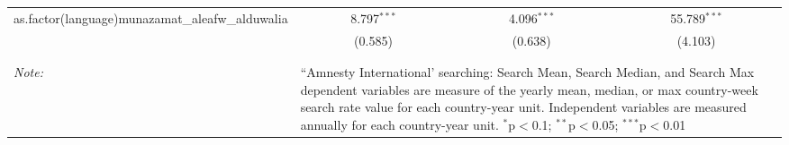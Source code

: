 \begin{table}[!htbp]
\begin{tabular}{@{\extracolsep{5pt}}lccc}
  as.factor(language)munazamat\_aleafw\_alduwalia & 8.797$^{***}$ & 4.096$^{***}$ & 55.789$^{***}$ \\ 
  & (0.585) & (0.638) & (4.103) \\ 
 \hline \\[-1.8ex] 
\hline 
\hline \\[-1.8ex] 
\textit{Note:}  & \multicolumn{3}{l}{\parbox[t]{8cm}{``Amnesty International' searching: Search Mean, Search Median, and Search Max dependent variables are measure of the yearly mean, median, or max country-week search rate value for each country-year unit. Independent variables are measured annually for each country-year unit. $^{*}$p$<$0.1; $^{**}$p$<$0.05; $^{***}$p$<$0.01}} \\ 
\end{tabular} 
\end{table} 
